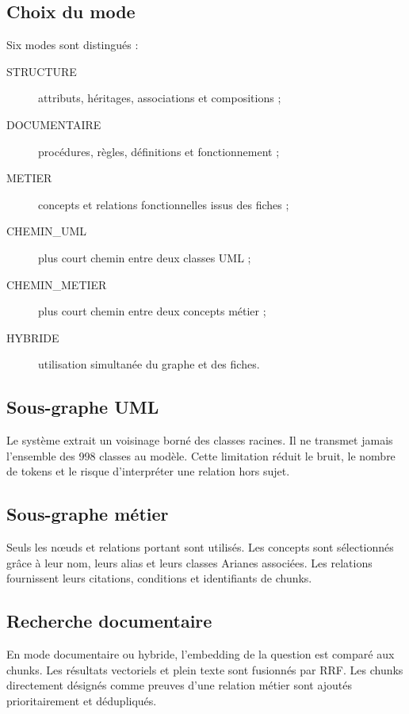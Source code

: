 \subsection{Choix du mode}

Six modes sont distingués :

\begin{description}
  \item[STRUCTURE] attributs, héritages, associations et compositions ;
  \item[DOCUMENTAIRE] procédures, règles, définitions et fonctionnement ;
  \item[METIER] concepts et relations fonctionnelles issus des fiches ;
  \item[CHEMIN\_UML] plus court chemin entre deux classes UML ;
  \item[CHEMIN\_METIER] plus court chemin entre deux concepts métier ;
  \item[HYBRIDE] utilisation simultanée du graphe et des fiches.
\end{description}

\subsection{Sous-graphe UML}

Le système extrait un voisinage borné des classes racines. Il ne transmet jamais l'ensemble des 998 classes au modèle. Cette limitation réduit le bruit, le nombre de tokens et le risque d'interpréter une relation hors sujet.

\subsection{Sous-graphe métier}

Seuls les nœuds et relations portant  sont utilisés. Les concepts sont sélectionnés grâce à leur nom, leurs alias et leurs classes Arianes associées. Les relations fournissent leurs citations, conditions et identifiants de chunks.

\subsection{Recherche documentaire}

En mode documentaire ou hybride, l'embedding de la question est comparé aux chunks. Les résultats vectoriels et plein texte sont fusionnés par RRF. Les chunks directement désignés comme preuves d'une relation métier sont ajoutés prioritairement et dédupliqués.

